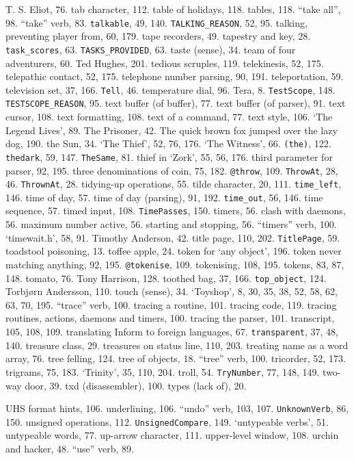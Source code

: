{{{T. S. Eliot, 76.
tab character, 112.
table of holidays, 118.
tables, 118.
``take all'', 98.
``take'' verb, 83.
{{\tt talkable}}, 49, 140.
{{\tt TALKING\_REASON}}, 52, 95.
talking, preventing player from, 60, 179.
tape recorders, 49.
tapestry and key, 28.
{{\tt task\_scores}}, 63.
{{\tt TASKS\_PROVIDED}}, 63.
taste (sense), 34.
team of four adventurers, 60.
Ted Hughes, 201.
tedious scruples, 119.
telekinesis, 52, 175.
telepathic contact, 52, 175.
telephone number parsing, 90, 191.
teleportation, 59.
television set, 37, 166.
{{\tt Tell}}, 46.
temperature dial, 96.
Tera, 8.
{{\tt TestScope}}, 148.
{{\tt TESTSCOPE\_REASON}}, 95.
text buffer (of buffer), 77.
text buffer (of parser), 91.
text cursor, 108.
text formatting, 108.
text of a command, 77.
text style, 106.
`The Legend Lives', 89.
The Prisoner, 42.
The quick brown fox jumped over the lazy dog, 190.
the Sun, 34.
`The Thief', 52, 76, 176.
`The Witness', 66.
{{\tt (the)}}, 122.
{{\tt thedark}}, 59, 147.
{{\tt TheSame}}, 81.
thief in `Zork', 55, 56, 176.
third parameter for parser, 92, 195.
three denominations of coin, 75, 182.
{{\tt @throw}}, 109.
{{\tt ThrowAt}}, 28, 46.
{{\tt ThrownAt}}, 28.
tidying-up operations, 55.
tilde character, 20, 111.
{{\tt time\_left}}, 146.
time of day, 57.
time of day (parsing), 91, 192.
{{\tt time\_out}}, 56, 146.
time sequence, 57.
timed input, 108.
{{\tt TimePasses}}, 150.
timers, 56.
\quad  clash with daemons, 56.
\quad  maximum number active, 56.
\quad  starting and stopping, 56.
``timers'' verb, 100.
`timewait.h', 58, 91.
Timothy Anderson, 42.
title page, 110, 202.
{{\tt TitlePage}}, 59.
toadstool poisoning, 13.
toffee apple, 24.
token for `any object', 196.
token never matching anything, 92, 195.
{{\tt @tokenise}}, 109.
tokenising, 108, 195.
tokens, 83, 87, 148.
tomato, 76.
Tony Harrison, 128.
toothed bag, 37, 166.
{{\tt top\_object}}, 124.
Torbj\o rn Andersson, 110.
touch (sense), 34.
`Toyshop', 8, 30, 35, 38, 52, 58, 62, 63, 70, 195.
``trace'' verb, 100.
tracing a routine, 101.
tracing code, 119.
tracing routines, actions, daemons and timers, 100.
tracing the parser, 101.
transcript, 105, 108, 109.
translating Inform to foreign languages, 67.
{{\tt transparent}}, 37, 48, 140.
treasure class, 29.
treasures on status line, 110, 203.
treating {\fam \ttfam \tentt name} as a word array, 76.
tree felling, 124.
tree of objects, 18.
``tree'' verb, 100.
tricorder, 52, 173.
trigrams, 75, 183.
`Trinity', 35, 110, 204.
troll, 54.
{{\tt TryNumber}}, 77, 148, 149.
two-way door, 39.
txd (disassembler), 100.
types (lack of), 20.

UHS format hints, 106.
underlining, 106.
``undo'' verb, 103, 107.
{{\tt UnknownVerb}}, 86, 150.
unsigned operations, 112.
{{\tt UnsignedCompare}}, 149.
`untypeable verbs', 51.
untypeable words, 77.
up-arrow character, 111.
upper-level window, 108.
urchin and hacker, 48.
``use'' verb, 89.

}}}
